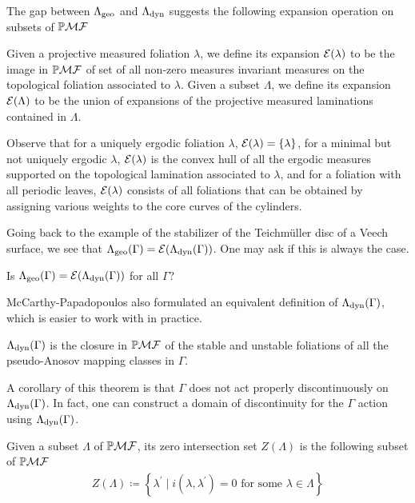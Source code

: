 \documentclass[12pt, reqno]{amsart}
\begin{document}
The gap between $\Lambda_{\mathrm{geo}}$ and $\Lambda_{\mathrm{dyn}}$ suggests the following expansion operation on subsets of $\mathbb{P}\mathcal{MF}$
\begin{definition}[Expansion]
  Given a projective measured foliation $\lambda$, we define its expansion $\mathcal{E}(\lambda)$ to be the image in $\mathbb{P}\mathcal{MF}$ of set of all non-zero measures invariant measures on the topological foliation associated to $\lambda$.
  Given a subset $\Lambda$, we define its expansion $\mathcal{E}(\Lambda)$ to be the union of expansions of the projective measured laminations contained in $\Lambda$.
\end{definition}
Observe that for a uniquely ergodic foliation $\lambda$, $\mathcal{E}(\lambda) = \{\lambda\}$, for a minimal but not uniquely ergodic $\lambda$, $\mathcal{E}(\lambda)$ is the convex hull of all the ergodic measures supported on the topological lamination associated to $\lambda$, and for a foliation with all periodic leaves, $\mathcal{E}(\lambda)$ consists of all foliations that can be obtained by assigning various weights to the core curves of the cylinders.

Going back to the example of the stabilizer of the Teichmüller disc of a Veech surface, we see that $\Lambda_{\mathrm{geo}}(\Gamma) = \mathcal{E}(\Lambda_{\mathrm{dyn}}(\Gamma))$.
One may ask if this is always the case.
\begin{question}
  Is $\Lambda_{\mathrm{geo}}(\Gamma) = \mathcal{E}(\Lambda_{\mathrm{dyn}}(\Gamma))$ for all $\Gamma$?
\end{question}

McCarthy-Papadopoulos also formulated an equivalent definition of $\Lambda_{\mathrm{dyn}}(\Gamma)$, which is easier to work with in practice.

\begin{theorem}
  \label{thm:equivalence-of-limit-sets}
  $\Lambda_{\mathrm{dyn}}(\Gamma)$ is the closure in $\mathbb{P}\mathcal{MF}$ of the stable and unstable foliations of all the pseudo-Anosov mapping classes in $\Gamma$.
\end{theorem}
A corollary of this theorem is that $\Gamma$ does not act properly discontinuously on $\Lambda_{\mathrm{dyn}}(\Gamma)$.
In fact, one can construct a domain of discontinuity for the $\Gamma$ action using $\Lambda_{\mathrm{dyn}}(\Gamma)$.
\begin{definition}
  Given a subset $\Lambda$ of $\mathbb{P}\mathcal{MF}$, its zero intersection set $Z(\Lambda)$ is the following subset of $\mathbb{P}\mathcal{MF}$
  \begin{align*}
    Z(\Lambda) \coloneqq \left\{ \lambda^{\prime} \mid i(\lambda, \lambda^{\prime}) = 0 \text{ for some $\lambda \in \Lambda$} \right\}
  \end{align*}
\end{definition}
\end{document}

